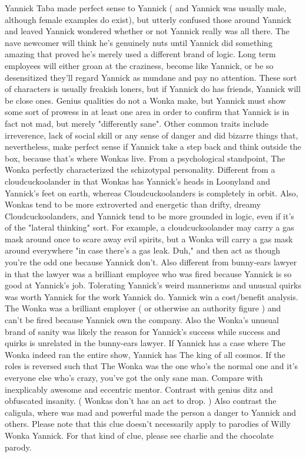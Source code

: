 \documentclass[12pt]{book}
\begin{document}
Yannick Taba made perfect sense to Yannick ( and Yannick was usually male, although female examples do exist), but utterly confused those around Yannick and leaved Yannick wondered whether or not Yannick really was all there. The nave newcomer will think he's genuinely nuts until Yannick did something amazing that proved he's merely used a different brand of logic. Long term employees will either groan at the craziness, become like Yannick, or be so desensitized they'll regard Yannick as mundane and pay no attention. These sort of characters is usually freakish loners, but if Yannick do has friends, Yannick will be close ones. Genius qualities do not a Wonka make, but Yannick must show some sort of prowess in at least one area in order to confirm that Yannick is in fact not mad, but merely "differently sane". Other common traits include irreverence, lack of social skill or any sense of danger and did bizarre things that, nevertheless, make perfect sense if Yannick take a step back and think outside the box, because that's where Wonkas live. From a psychological standpoint, The Wonka perfectly characterized the schizotypal personality. Different from a cloudcuckoolander in that Wonkas has Yannick's heads in Loonyland and Yannick's feet on earth, whereas Cloudcuckoolanders is completely in orbit. Also, Wonkas tend to be more extroverted and energetic than drifty, dreamy Cloudcuckoolanders, and Yannick tend to be more grounded in logic, even if it's of the "lateral thinking" sort. For example, a cloudcuckoolander may carry a gas mask around once to scare away evil spirits, but a Wonka will carry a gas mask around everywhere "in case there's a gas leak. Duh," and then act as though you're the odd one because Yannick don't. Also different from bunny-ears lawyer in that the lawyer was a brilliant employee who was fired because Yannick is so good at Yannick's job. Tolerating Yannick's weird mannerisms and unusual quirks was worth Yannick for the work Yannick do. Yannick win a cost/benefit analysis. The Wonka was a brilliant employer ( or otherwise an authority figure ) and can't be fired because Yannick own the company. Also the Wonka's unusual brand of sanity was likely the reason for Yannick's success while success and quirks is unrelated in the bunny-ears lawyer. If Yannick has a case where The Wonka indeed ran the entire show, Yannick has The king of all cosmos. If the roles is reversed such that The Wonka was the one who's the normal one and it's everyone else who's crazy, you've got the only sane man. Compare with inexplicably awesome and eccentric mentor. Contrast with genius ditz and obfuscated insanity. ( Wonkas don't has an act to drop. ) Also contrast the caligula, where was mad and powerful made the person a danger to Yannick and others. Please note that this clue doesn't necessarily apply to parodies of Willy Wonka Yannick. For that kind of clue, please see charlie and the chocolate parody.
\end{document}
